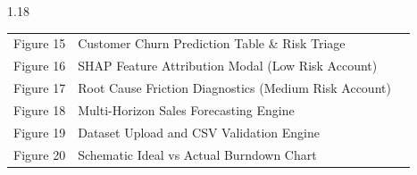 \documentclass[12pt,a4paper]{article}
\begin{document}
\begin{spacing}{1.18}
\begin{tabular}{p{2cm}p{10.5cm}r}
Figure 15 & Customer Churn Prediction Table \& Risk Triage & \pageref{fig:assets/screenshots/customer_churn_analytics.png}\\
Figure 16 & SHAP Feature Attribution Modal (Low Risk Account) & \pageref{fig:assets/screenshots/shap_waterfall_modal.png}\\
Figure 17 & Root Cause Friction Diagnostics (Medium Risk Account) & \pageref{fig:assets/screenshots/high_risk_root_cause_modal.png}\\
Figure 18 & Multi-Horizon Sales Forecasting Engine & \pageref{fig:assets/screenshots/sales_forecast.png}\\
Figure 19 & Dataset Upload and CSV Validation Engine & \pageref{fig:assets/screenshots/dataset_upload.png}\\
Figure 20 & Schematic Ideal vs Actual Burndown Chart & \pageref{fig:burndown_actual}\\
\end{tabular}
\end{spacing}
\newpage
\end{document}
